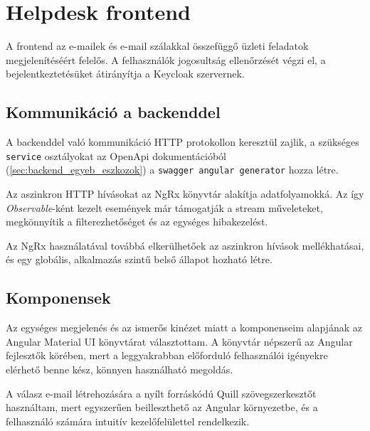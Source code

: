 \section{Helpdesk frontend}
A frontend az e-mailek és e-mail szálakkal összefüggő üzleti feladatok megjelenítéséért felelős. A felhasználók jogosultság ellenőrzését végzi el, a bejelentkeztetésüket átirányítja a Keycloak szervernek. 


\subsection{Kommunikáció a backenddel}
A backenddel való kommunikáció HTTP protokollon keresztül zajlik, a szükséges \texttt{service} osztályokat az OpenApi dokumentációból (\ref{sec:backend_egyeb_eszkozok}) a \texttt{swagger angular generator} hozza létre.

Az aszinkron HTTP hívásokat az NgRx könyvtár alakítja adatfolyamokká. 
Az így \emph{Observable}-ként kezelt események már támogatják a stream műveleteket, megkönnyítik a filterezhetőséget és az egységes hibakezelést. 

Az NgRx használatával továbbá elkerülhetőek az aszinkron hívások mellékhatásai, és egy globális, alkalmazás szintű belső állapot hozható létre.

\subsection{Komponensek}
Az egységes megjelenés és az ismerős kinézet miatt a komponenseim alapjának az Angular Material UI könyvtárat választottam. A könyvtár népszerű az Angular fejlesztők körében, mert a leggyakrabban előforduló felhasználói igényekre elérhető benne kész, könnyen használható megoldás.

A válasz e-mail létrehozására a nyílt forráskódú Quill szövegszerkesztőt használtam, mert egyszerűen beilleszthető az Angular környezetbe, és a felhasználó számára intuitív kezelőfelülettel rendelkezik.


